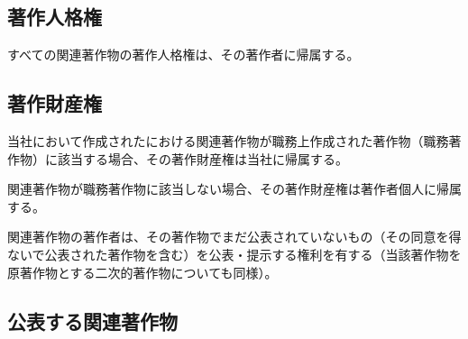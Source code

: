 

\subsection{著作人格権}
すべての関連著作物の著作人格権は、その著作者に帰属する。


\subsection{著作財産権}
当社において作成された\DMname における関連著作物が職務上作成された著作物（職務著作物）に該当する場合、その著作財産権は当社に帰属する。

関連著作物が職務著作物に該当しない場合、その著作財産権は著作者個人に帰属する。



\clearpage
関連著作物の著作者は、その著作物でまだ公表されていないもの（その同意を得ないで公表された著作物を含む）を公表・提示する権利を有する（当該著作物を原著作物とする二次的著作物についても同様）。


\subsection{公表する関連著作物}

